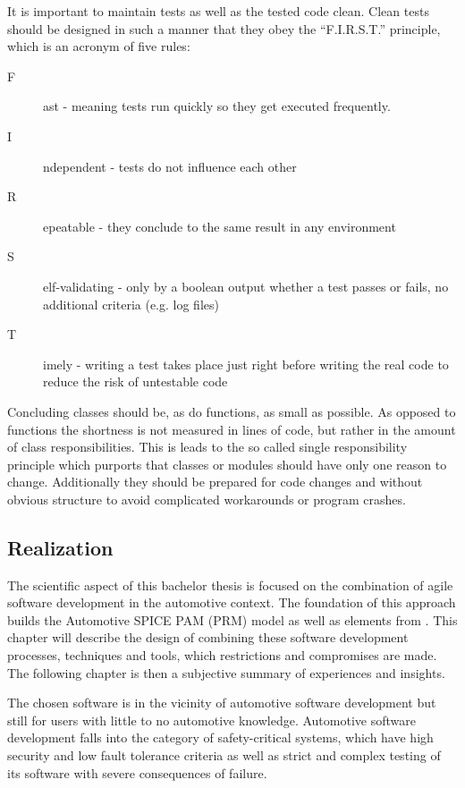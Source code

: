 It is important to maintain tests as well as the tested code clean. Clean tests should be designed in such a manner that they obey the “F.I.R.S.T.” principle, 
which is an acronym of five rules:

\begin{description}
 \item [F]ast - meaning tests run quickly so they get executed frequently.
 \item [I]ndependent - tests do not influence each other
 \item [R]epeatable - they conclude to the same result in any environment
 \item [S]elf-validating - only by a boolean output whether a test passes or fails, no additional criteria (e.g. log files)
 \item [T]imely - writing a test takes place just right before writing the real code to reduce the risk of untestable code
\end{description}

Concluding classes should be, as do functions, as small as possible. As opposed to functions the shortness is not measured in lines of code, but 
rather in the amount of class responsibilities. This is leads to the so called single responsibility principle which purports that classes or modules 
should have only one reason to change. Additionally they should be prepared for code changes and without obvious structure to avoid complicated workarounds
or program crashes.

\subsection{Realization}

The scientific aspect of this bachelor thesis is focused on the combination of agile software development in the automotive context. The 
foundation of this approach builds the Automotive SPICE PAM (PRM) model as well as elements from \citeauthor{BECK} . 
This chapter will describe the design of combining these software development processes, techniques and tools, which restrictions  
and compromises are made. The following chapter  is then a subjective summary of experiences and insights.

The chosen software is in the vicinity of automotive software development but still for users with little to no automotive knowledge. 
Automotive software development falls into the category of safety-critical systems, which have high 
security and low fault tolerance criteria as well as strict and complex testing of its software with severe consequences of failure.

